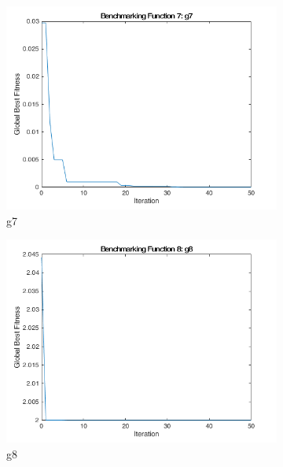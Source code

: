 \begin{figure}
  \centering
  \begin{subfigure}[b]{0.4\textwidth}
    \includegraphics[width=\textwidth]{img/summary/g7}
    \caption{g7}
  \end{subfigure}
  \begin{subfigure}[b]{0.4\textwidth}
    \includegraphics[width=\textwidth]{img/summary/g8}
    \caption{g8}
  \end{subfigure}
  \begin{subfigure}[b]{0.4\textwidth}

\end{subfigure}
\end{figure}

